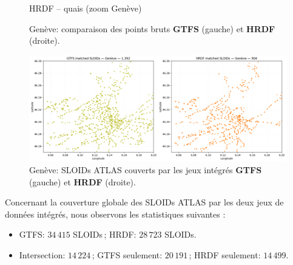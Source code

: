 \begin{figure}[H]
\begin{minipage}[t]{0.49\linewidth}
    \vspace{0.2em}
    \small HRDF – quais (zoom Genève)
  \end{minipage}
  \caption[Genève: GTFS vs HRDF (points bruts)]{Genève: comparaison des points bruts \textbf{GTFS} (gauche) et \textbf{HRDF} (droite).}
  \label{fig:geneva_gtfs_hrdf_raw}
\end{figure}

\begin{figure}[H]
  \centering
  \includegraphics[width=.95\linewidth]{figures/plots/geneva_matched_sloids_gtfs_hrdf.png}
  \caption[Genève: SLOIDs appariés (GTFS vs HRDF)]{Genève: SLOIDs ATLAS couverts par les jeux intégrés \textbf{GTFS} (gauche) et \textbf{HRDF} (droite).}
  \label{fig:geneva_matched_sloids}
\end{figure}

Concernant la couverture globale des SLOIDs ATLAS par les deux jeux de données intégrés, nous observons les statistiques suivantes :

\begin{itemize}
  \item GTFS: \textit{\(34\,415\)} SLOIDs\,; HRDF: \textit{\(28\,723\)} SLOIDs.
  \item Intersection: \textit{\(14\,224\)}\,; GTFS seulement: \textit{\(20\,191\)}\,; HRDF seulement: \textit{\(14\,499\)}.
\end{itemize}
